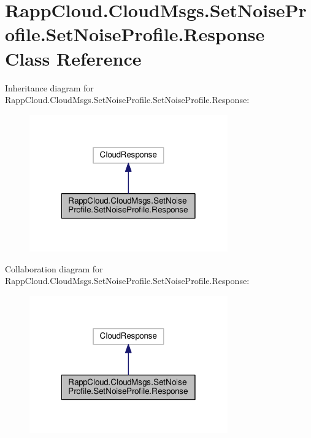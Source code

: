 \hypertarget{classRappCloud_1_1CloudMsgs_1_1SetNoiseProfile_1_1SetNoiseProfile_1_1Response}{\section{Rapp\-Cloud.\-Cloud\-Msgs.\-Set\-Noise\-Profile.\-Set\-Noise\-Profile.\-Response Class Reference}
\label{classRappCloud_1_1CloudMsgs_1_1SetNoiseProfile_1_1SetNoiseProfile_1_1Response}
}


Inheritance diagram for Rapp\-Cloud.\-Cloud\-Msgs.\-Set\-Noise\-Profile.\-Set\-Noise\-Profile.\-Response\-:
\nopagebreak
\begin{figure}[H]
\begin{center}
\leavevmode
\includegraphics[width=242pt]{classRappCloud_1_1CloudMsgs_1_1SetNoiseProfile_1_1SetNoiseProfile_1_1Response__inherit__graph}
\end{center}
\end{figure}


Collaboration diagram for Rapp\-Cloud.\-Cloud\-Msgs.\-Set\-Noise\-Profile.\-Set\-Noise\-Profile.\-Response\-:
\nopagebreak
\begin{figure}[H]
\begin{center}
\leavevmode
\includegraphics[width=242pt]{classRappCloud_1_1CloudMsgs_1_1SetNoiseProfile_1_1SetNoiseProfile_1_1Response__coll__graph}
\end{center}
\end{figure}
